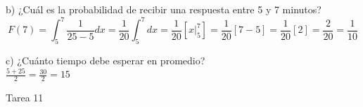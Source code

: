 \documentclass[a4paper, 12pt]{article}
\newcommand{\Aspace}{0.2cm}
\begin{document}
\begin{enumerate}
            \vspace{\Aspace} \par
            b) ¿Cuál es la probabilidad de recibir una respuesta entre 5 y 7 minutos?
            \\ { \color{azul} 
                \[
                    F(7)
                    = \int_{5}^{7} \frac{1}{25 - 5}dx
                    = \frac{1}{20} \int_{5}^{7}dx
                    = \frac{1}{20} \left[ x \Big|_{5}^{7} \right]
                    = \frac{1}{20} [7 - 5]
                    = \frac{1}{20} [2]
                    = \frac{2}{20}
                    = \frac{1}{10}
                \]
            }

            \vspace{\Aspace} \par
            c) ¿Cuánto tiempo debe esperar en promedio?
            \\ { \color{azul} $\frac{5 + 25}{2} = \frac{30}{2} = 15$ }


    \end{enumerate}



    \newpage
    \vspace{0.3cm}

    \begin{center}
        { \LARGE Tarea 11}
    \end{center}
\end{document}
